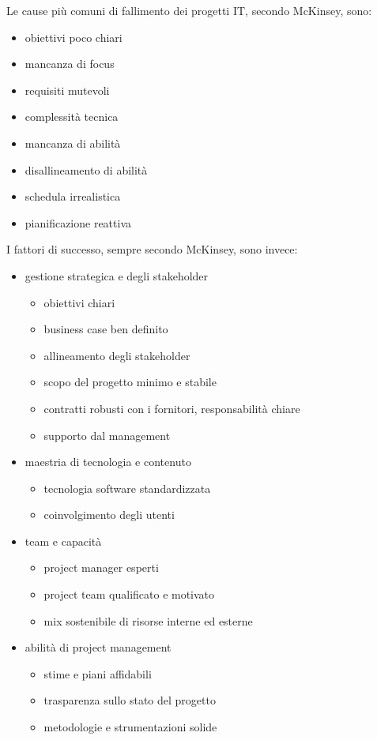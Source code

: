 \documentclass[answers, a4paper, 11pt]{exam}
\begin{document}
Le cause più comuni di fallimento dei progetti IT, secondo McKinsey, sono:

\begin{itemize}
    \item obiettivi poco chiari
    \item mancanza di focus
    \item requisiti mutevoli
    \item complessità tecnica
    \item mancanza di abilità 
    \item disallineamento di abilità
    \item schedula irrealistica
    \item pianificazione reattiva
\end{itemize}

I fattori di successo, sempre secondo McKinsey, sono invece:

\begin{itemize}
    \item gestione strategica e degli stakeholder
    \begin{itemize}
        \item obiettivi chiari
        \item business case ben definito
        \item allineamento degli stakeholder
        \item scopo del progetto minimo e stabile
        \item contratti robusti con i fornitori, responsabilità chiare
        \item supporto dal management
    \end{itemize}
    \item maestria di tecnologia e contenuto
    \begin{itemize}
        \item tecnologia software standardizzata
        \item coinvolgimento degli utenti
    \end{itemize}
    \item team e capacità
    \begin{itemize}
        \item project manager esperti
        \item project team qualificato e motivato
        \item mix sostenibile di risorse interne ed esterne
    \end{itemize}
    \item abilità di project management
    \begin{itemize}
        \item stime e piani affidabili
        \item trasparenza sullo stato del progetto
        \item metodologie e strumentazioni solide
    \end{itemize}
\end{itemize}
\end{document}
